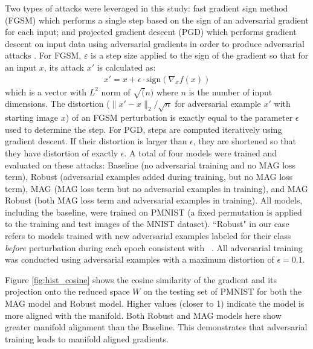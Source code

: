 Two types of attacks were leveraged in this study: fast gradient sign
method (FGSM) \citep{goodfellow_explaining_2014} which performs a
single step based on the sign of an adversarial gradient for each
input; and projected gradient descent (PGD) which performs gradient
descent on input data using adversarial gradients in order to produce
adversarial attacks \citep{madry_towards_2017}. For FGSM, $\varepsilon$ is a step size applied to the sign of the gradient so that for an input $x$, its attack $x'$ is calculated as:
\begin{align}
  x' = x + \epsilon \cdot \text{sign}(\nabla_x f(x))
\end{align}
which is a vector with $L^2$ norm of $\sqrt(n)$ where $n$ is the number of input dimensions. The distortion ($\|x'-x\|_2/\sqrt{n}$ for adversarial example $x'$ with starting image $x$) of an FGSM perturbation is exactly equal to the parameter $\epsilon$ used to determine the step. For PGD, steps are computed iteratively using gradient descent. If their distortion is larger than $\epsilon$, they are shortened so that they have distortion of exactly $\epsilon$.
A total of four models were trained and evaluated on these attacks: Baseline (no adversarial training and no MAG loss term), Robust (adversarial examples added during training, but no MAG loss term), MAG (MAG loss term but no adversarial examples in training), and MAG Robust (both MAG loss term and adversarial examples in training).
All models, including the baseline, were trained on PMNIST (a fixed
permutation is applied to the training and test images of the MNIST dataset).
``Robust" in our case refers to models trained with new adversarial
examples labeled for their class \emph{before} perturbation during
each epoch consistent with ~\citet{tramer2019adversarial}. All adversarial training was conducted using adversarial examples with a maximum distortion of $\epsilon = 0.1$.

Figure \ref{fig:hist_cosine} shows the cosine similarity of the
gradient and its projection onto the reduced space $W$ on the testing set of PMNIST for both the MAG model and Robust model. Higher values (closer to 1) indicate the model is more aligned with the manifold. Both Robust and MAG models here show greater manifold alignment than the Baseline. This demonstrates that adversarial training leads to manifold aligned gradients. 


